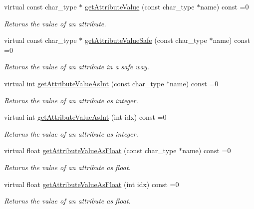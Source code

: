 \begin{DoxyCompactItemize}
virtual const char\+\_\+type $\ast$ \hyperlink{classirr_1_1io_1_1IIrrXMLReader_adaac9a49b396e7fc2d335335f36391a9}{get\+Attribute\+Value} (const char\+\_\+type $\ast$name) const =0
\begin{DoxyCompactList}\small\item\em Returns the value of an attribute. \end{DoxyCompactList}\item 
virtual const char\+\_\+type $\ast$ \hyperlink{classirr_1_1io_1_1IIrrXMLReader_a7674852b2e24b2710b90aab10ef1fc22}{get\+Attribute\+Value\+Safe} (const char\+\_\+type $\ast$name) const =0
\begin{DoxyCompactList}\small\item\em Returns the value of an attribute in a safe way. \end{DoxyCompactList}\item 
virtual int \hyperlink{classirr_1_1io_1_1IIrrXMLReader_ab37bef58865355a7dba0011a38e6c8e7}{get\+Attribute\+Value\+As\+Int} (const char\+\_\+type $\ast$name) const =0
\begin{DoxyCompactList}\small\item\em Returns the value of an attribute as integer. \end{DoxyCompactList}\item 
virtual int \hyperlink{classirr_1_1io_1_1IIrrXMLReader_a8f2d57c9f358b9683fb177f440661426}{get\+Attribute\+Value\+As\+Int} (int idx) const =0
\begin{DoxyCompactList}\small\item\em Returns the value of an attribute as integer. \end{DoxyCompactList}\item 
virtual float \hyperlink{classirr_1_1io_1_1IIrrXMLReader_a2b1032f213e9910827842f6057269235}{get\+Attribute\+Value\+As\+Float} (const char\+\_\+type $\ast$name) const =0
\begin{DoxyCompactList}\small\item\em Returns the value of an attribute as float. \end{DoxyCompactList}\item 
virtual float \hyperlink{classirr_1_1io_1_1IIrrXMLReader_a3a01b3cec9db01d00928074846d39add}{get\+Attribute\+Value\+As\+Float} (int idx) const =0
\begin{DoxyCompactList}\small\item\em Returns the value of an attribute as float. \end{DoxyCompactList}\item 

\end{DoxyCompactItemize}
